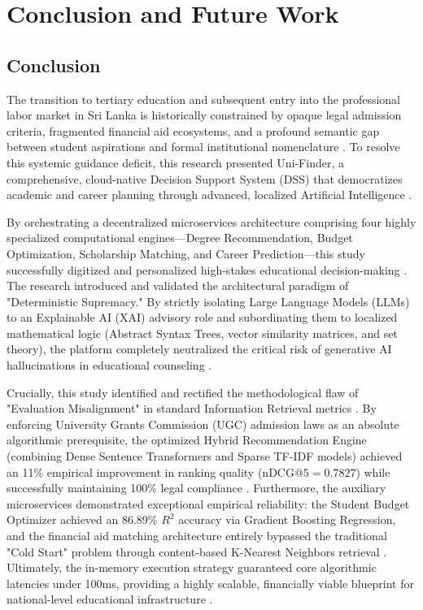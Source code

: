 \documentclass[conference]{IEEEtran}
\begin{document}
\section{Conclusion and Future Work}

\subsection{Conclusion}
The transition to tertiary education and subsequent entry into the professional labor market in Sri Lanka is historically constrained by opaque legal admission criteria, fragmented financial aid ecosystems, and a profound semantic gap between student aspirations and formal institutional nomenclature \cite{ugc2024overview, sljssh2021online}. To resolve this systemic guidance deficit, this research presented Uni-Finder, a comprehensive, cloud-native Decision Support System (DSS) that democratizes academic and career planning through advanced, localized Artificial Intelligence \cite{seu2024stream, silva2026systematic}.

By orchestrating a decentralized microservices architecture comprising four highly specialized computational engines---Degree Recommendation, Budget Optimization, Scholarship Matching, and Career Prediction---this study successfully digitized and personalized high-stakes educational decision-making \cite{manouselis2021recommendation, sani2021recommender}. The research introduced and validated the architectural paradigm of "Deterministic Supremacy." By strictly isolating Large Language Models (LLMs) to an Explainable AI (XAI) advisory role and subordinating them to localized mathematical logic (Abstract Syntax Trees, vector similarity matrices, and set theory), the platform completely neutralized the critical risk of generative AI hallucinations in educational counseling \cite{wang2023finding, springer2024genai_sl}.

Crucially, this study identified and rectified the methodological flaw of "Evaluation Misalignment" in standard Information Retrieval metrics \cite{silva2026systematic}. By enforcing University Grants Commission (UGC) admission laws as an absolute algorithmic prerequisite, the optimized Hybrid Recommendation Engine (combining Dense Sentence Transformers and Sparse TF-IDF models) achieved an 11\% empirical improvement in ranking quality ($\text{nDCG@5} = 0.7827$) while successfully maintaining 100\% legal compliance \cite{seu2024stream}. Furthermore, the auxiliary microservices demonstrated exceptional empirical reliability: the Student Budget Optimizer achieved an 86.89\% $R^2$ accuracy via Gradient Boosting Regression, and the financial aid matching architecture entirely bypassed the traditional "Cold Start" problem through content-based K-Nearest Neighbors retrieval \cite{li2024dynamic, tarus2018matrix}. Ultimately, the in-memory execution strategy guaranteed core algorithmic latencies under 100ms, providing a highly scalable, financially viable blueprint for national-level educational infrastructure \cite{alghamdi2021collaborative}.
\end{document}
